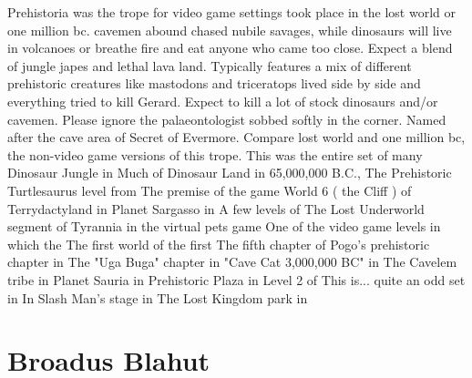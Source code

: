 \documentclass[12pt]{book}
\begin{document}
Prehistoria was the trope for video game settings took place in the lost world or one million bc. cavemen abound chased nubile savages, while dinosaurs will live in volcanoes or breathe fire and eat anyone who came too close. Expect a blend of jungle japes and lethal lava land. Typically features a mix of different prehistoric creatures  like mastodons and triceratops lived side by side and everything tried to kill Gerard. Expect to kill a lot of stock dinosaurs and/or cavemen. Please ignore the palaeontologist sobbed softly in the corner. Named after the cave area of Secret of Evermore. Compare lost world and one million bc, the non-video game versions of this trope. This was the entire set of many Dinosaur Jungle in Much of Dinosaur Land in 65,000,000 B.C., The Prehistoric Turtlesaurus level from The premise of the game World 6 ( the Cliff ) of Terrydactyland in Planet Sargasso in A few levels of The Lost Underworld segment of Tyrannia in the virtual pets game One of the video game levels in which the The first world of the first The fifth chapter of Pogo's prehistoric chapter in The "Uga Buga" chapter in "Cave Cat 3,000,000 BC" in The Cavelem tribe in Planet Sauria in Prehistoric Plaza in Level 2 of This is... quite an odd set in In Slash Man's stage in The Lost Kingdom park in



\chapter{Broadus Blahut}
\end{document}
